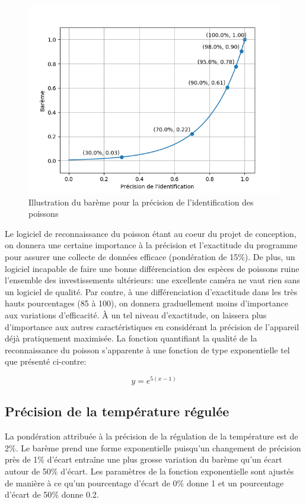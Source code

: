 \begin{figure}[htb!]
    \centering
    \includegraphics[width=0.45\linewidth]{fig/bareme_ident.png}
    \caption{Illustration du barème pour la précision de l'identification des poissons}
    \label{fig:bareme_precision}
\end{figure}

Le logiciel de reconnaissance du poisson étant au coeur du projet de conception, on donnera une certaine importance à la précision et l'exactitude du programme pour assurer une collecte de données efficace (pondération de 15\%). De plus, un logiciel incapable de faire une bonne différenciation des espèces de poissons ruine l'ensemble des investissements ultérieurs: une excellente caméra ne vaut rien sans un logiciel de qualité. Par contre, à une différenciation d'exactitude dans les très hauts pourcentages (85 à 100), on donnera graduellement moins d'importance aux variations d'efficacité. À un tel niveau d'exactitude, on laissera plus d'importance aux autres caractéristiques en considérant la précision de l'appareil déjà pratiquement maximisée. La fonction quantifiant la qualité de la reconnaissance du poisson s'apparente à une fonction de type exponentielle tel que présenté ci-contre:

\begin{equation}
    y = e^{5(x-1)}
    \label{eq:bareme_precision}
\end{equation}

\subsection{Précision de la température régulée}
\label{Ptree}

La pondération attribuée à la précision de la régulation de la température est de 2$\%$. Le barème prend une forme exponentielle puisqu'un changement de précision près de 1$\%$ d'écart entraîne une plus grosse variation du barème qu'un écart autour de 50$\%$ d'écart. Les paramètres de la fonction exponentielle sont ajustés de manière à ce qu'un pourcentage d'écart de 0$\%$ donne 1 et un pourcentage d'écart de 50$\%$ donne 0.2.

